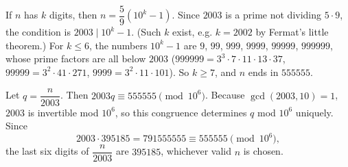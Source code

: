 If $n$ has $k$ digits, then $n=\dfrac59\left(10^k-1\right)$. Since $2003$ is a prime not dividing $5\cdot9$, the condition is $2003\mid10^k-1$. (Such $k$ exist, e.g. $k=2002$ by Fermat's little theorem.) For $k\le6$, the numbers $10^k-1$ are $9$, $99$, $999$, $9999$, $99999$, $999999$, whose prime factors are all below $2003$ ($999999=3^3\cdot7\cdot11\cdot13\cdot37$, $99999=3^2\cdot41\cdot271$, $9999=3^2\cdot11\cdot101$). So $k\ge7$, and $n$ ends in $555555$.

Let $q=\dfrac{n}{2003}$. Then $2003q\equiv555555\pmod{10^6}$. Because $\gcd(2003,10)=1$, $2003$ is invertible mod $10^6$, so this congruence determines $q$ mod $10^6$ uniquely. Since
\[2003\cdot395185=791555555\equiv555555\pmod{10^6},\]
the last six digits of $\dfrac n{2003}$ are $\boxed{395185}$, whichever valid $n$ is chosen.
